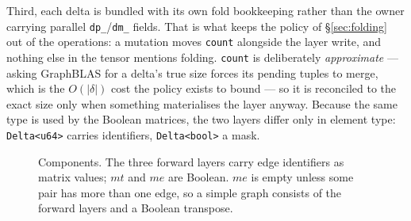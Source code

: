 \documentclass[11pt,a4paper]{article}
\theoremstyle{plain}
\theoremstyle{definition}
\theoremstyle{remark}
\newcommand{\M}{\mathsf{M}}
\begin{document}
Third, each delta is bundled with its own fold bookkeeping rather than the
owner carrying parallel \texttt{dp\_}/\texttt{dm\_} fields. That is what keeps
the policy of \S\ref{sec:folding} out of the operations: a mutation moves
\texttt{count} alongside the layer write, and nothing else in the tensor
mentions folding. \texttt{count} is deliberately \emph{approximate} --- asking
GraphBLAS for a delta's true size forces its pending tuples to merge, which is
the $O(|\delta|)$ cost the policy exists to bound --- so it is reconciled to the
exact size only when something materialises the layer anyway. Because the same
type is used by the Boolean matrices, the two layers differ only in element
type: \texttt{Delta<u64>} carries identifiers, \texttt{Delta<bool>} a mask.

\begin{figure}[t]
\centering
{}
\caption{Components. The three forward layers carry edge identifiers as
matrix values; $mt$ and $me$ are Boolean. $me$ is empty unless some pair has
more than one edge, so a simple graph consists of the forward layers and a
Boolean transpose.}
\label{fig:components}
\end{figure}
\end{document}
